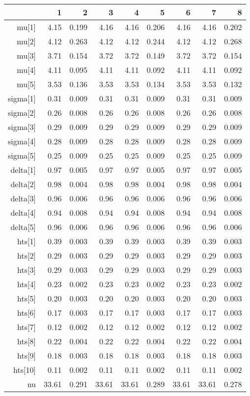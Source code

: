 \begin{table}[ht]
\centering
\begin{tabular}{rrrrrrrrr}
  \hline
 & 1 & 2 & 3 & 4 & 5 & 6 & 7 & 8 \\ 
  \hline
mu[1] & 4.15 & 0.199 & 4.16 & 4.16 & 0.206 & 4.16 & 4.16 & 0.202 \\ 
  mu[2] & 4.12 & 0.263 & 4.12 & 4.12 & 0.244 & 4.12 & 4.12 & 0.268 \\ 
  mu[3] & 3.71 & 0.154 & 3.72 & 3.72 & 0.149 & 3.72 & 3.72 & 0.154 \\ 
  mu[4] & 4.11 & 0.095 & 4.11 & 4.11 & 0.092 & 4.11 & 4.11 & 0.092 \\ 
  mu[5] & 3.53 & 0.136 & 3.53 & 3.53 & 0.134 & 3.53 & 3.53 & 0.132 \\ 
  sigma[1] & 0.31 & 0.009 & 0.31 & 0.31 & 0.009 & 0.31 & 0.31 & 0.009 \\ 
  sigma[2] & 0.26 & 0.008 & 0.26 & 0.26 & 0.008 & 0.26 & 0.26 & 0.008 \\ 
  sigma[3] & 0.29 & 0.009 & 0.29 & 0.29 & 0.009 & 0.29 & 0.29 & 0.009 \\ 
  sigma[4] & 0.28 & 0.009 & 0.28 & 0.28 & 0.009 & 0.28 & 0.28 & 0.009 \\ 
  sigma[5] & 0.25 & 0.009 & 0.25 & 0.25 & 0.009 & 0.25 & 0.25 & 0.009 \\ 
  delta[1] & 0.97 & 0.005 & 0.97 & 0.97 & 0.005 & 0.97 & 0.97 & 0.005 \\ 
  delta[2] & 0.98 & 0.004 & 0.98 & 0.98 & 0.004 & 0.98 & 0.98 & 0.004 \\ 
  delta[3] & 0.96 & 0.006 & 0.96 & 0.96 & 0.006 & 0.96 & 0.96 & 0.006 \\ 
  delta[4] & 0.94 & 0.008 & 0.94 & 0.94 & 0.008 & 0.94 & 0.94 & 0.008 \\ 
  delta[5] & 0.96 & 0.006 & 0.96 & 0.96 & 0.006 & 0.96 & 0.96 & 0.006 \\ 
  hts[1] & 0.39 & 0.003 & 0.39 & 0.39 & 0.003 & 0.39 & 0.39 & 0.003 \\ 
  hts[2] & 0.29 & 0.003 & 0.29 & 0.29 & 0.003 & 0.29 & 0.29 & 0.003 \\ 
  hts[3] & 0.29 & 0.003 & 0.29 & 0.29 & 0.003 & 0.29 & 0.29 & 0.003 \\ 
  hts[4] & 0.23 & 0.002 & 0.23 & 0.23 & 0.002 & 0.23 & 0.23 & 0.002 \\ 
  hts[5] & 0.20 & 0.003 & 0.20 & 0.20 & 0.003 & 0.20 & 0.20 & 0.003 \\ 
  hts[6] & 0.17 & 0.003 & 0.17 & 0.17 & 0.003 & 0.17 & 0.17 & 0.003 \\ 
  hts[7] & 0.12 & 0.002 & 0.12 & 0.12 & 0.002 & 0.12 & 0.12 & 0.002 \\ 
  hts[8] & 0.22 & 0.004 & 0.22 & 0.22 & 0.004 & 0.22 & 0.22 & 0.004 \\ 
  hts[9] & 0.18 & 0.003 & 0.18 & 0.18 & 0.003 & 0.18 & 0.18 & 0.003 \\ 
  hts[10] & 0.11 & 0.002 & 0.11 & 0.11 & 0.002 & 0.11 & 0.11 & 0.002 \\ 
  nu & 33.61 & 0.291 & 33.61 & 33.61 & 0.289 & 33.61 & 33.61 & 0.278 \\ 
   \hline
\end{tabular}
\end{table}
